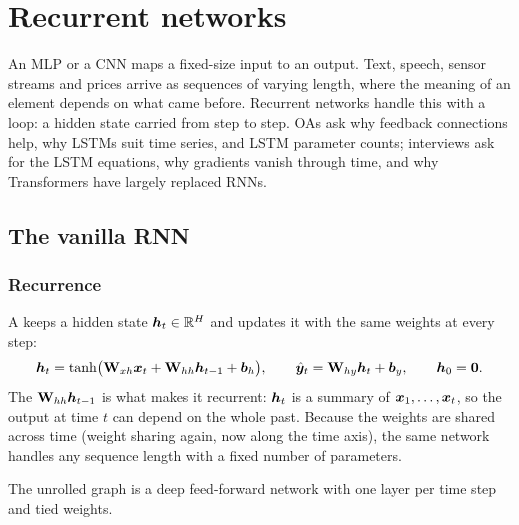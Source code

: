 \chapter{Recurrent networks}
\label{ch:rnn}

An MLP or a CNN maps a fixed-size input to an output. Text, speech, sensor streams and
prices arrive as sequences of varying length, where the meaning of an element depends on
what came before. Recurrent networks handle this with a loop: a hidden state carried from
step to step. OAs ask why feedback connections help, why LSTMs suit time series, and LSTM
parameter counts; interviews ask for the LSTM equations, why gradients vanish through
time, and why Transformers have largely replaced RNNs.

\section{The vanilla RNN}

\subsection{Recurrence}
A  keeps a hidden state ${\bm{h}}_t\in\mathbb R^H$ and updates it with
the same weights at every step:
\[
	{\bm{h}}_t=\tanh\bigl({\mathbf{W}}_{xh}{\bm{x}}_t+{\mathbf{W}}_{hh}{\bm{h}}_{t-1}+{\bm{b}}_h\bigr),\qquad
	\hat{\bm{y}}_t={\mathbf{W}}_{hy}{\bm{h}}_t+{\bm{b}}_y,\qquad {\bm{h}}_0={\bm{0}}.
\]
The  ${\mathbf{W}}_{hh}{\bm{h}}_{t-1}$ is what makes it recurrent: ${\bm{h}}_t$ is a
summary of ${\bm{x}}_1,\dots,{\bm{x}}_t$, so the output at time $t$ can depend on the whole past. Because the
weights are shared across time (weight sharing again, now along the time axis), the same network
handles any sequence length with a fixed number of parameters.

\begin{center}
\end{center}
The unrolled graph is a deep feed-forward network with one layer per time step and tied weights.

